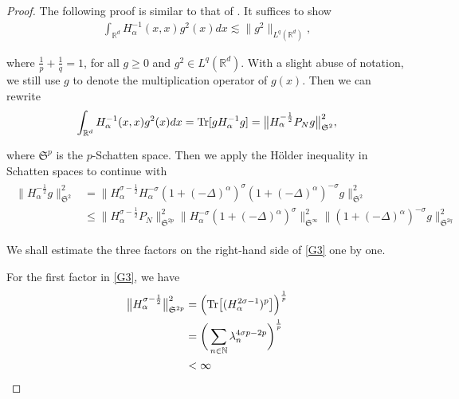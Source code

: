 \documentclass[%
11pt,  reqno]{amsart}
\theoremstyle{remarkstyle}
\newcommand{\1}{\hspace{0.2mm}\text{I}\hspace{0.2mm}}
\newcommand{\noi}{\noindent}
\newcommand{\R}{\mathbb{R}}
\newcommand{\al}{\alpha}
\newcommand{\ld}{\lambda}
\newcommand{\s}{\sigma}
\newcommand{\les}{\lesssim}
\newcommand{\N}{\mathbb{N}}
\numberwithin{equation}{section}
\numberwithin{theorem}{section}
\begin{document}
	
	\begin{proof}
		The following proof is similar to that of \cite{DR23}.  
		It suffices to show
		\begin{align}
			\label{G1}
			\int_{\R^d} H_\al^{-1}  (x,x) g^2(x) dx \les   \|g^2 \|_{L^q (\R^d)},
		\end{align}
		
		\noi 
		where $\frac1p + \frac1q = 1$, for all $g \ge 0$ and $g^{2} \in L^q({\R^d})$.
		With a slight abuse of notation, we still use $g$ to denote the multiplication operator of $g(x)$. 
		Then we can rewrite
		\begin{align}
			\label{G2}
			\int_{\R^d} H_\al^{-1}  (x,x) g^2(x) dx  = \textup{Tr} [g H_\al^{-1}  g]  = \big\|  H_\al^{-\frac12} P_N g\big\|_{\mathfrak S^2}^2,
		\end{align}
		
		\noi
		where $\mathfrak S^p$ is the $p$-Schatten space. 
		Then we apply the H\"older inequality in Schatten spaces to continue with
		\begin{align}
			\begin{split}
				\big\|  H_\al^{-\frac12}  g\big\|_{\mathfrak S^2}^2 & =  \big\|  H_\al^{\s-\frac12}  H_\al^{-\s} (1+ (-\Delta)^\al)^{ \s} (1+ (-\Delta)^\al)^{- \s}  g\big\|_{\mathfrak S^2}^2 \\
				& \le \big\|   H_\al^{\s-\frac12}P_N  \big\|_{\mathfrak S^{2p}}^2 \big\|  H_\al^{-\s} (1+ (-\Delta)^\al)^{ \s}\big\|_{\mathfrak S^\infty}^2 \big\|  (1+ (-\Delta)^\al)^{ -\s}  g\big\|_{\mathfrak S^{2q}}^2
			\end{split}
			\label{G3}
		\end{align}
		
		\noi 
		We shall estimate the three factors on the right-hand side of \eqref{G3} one by one.
		
		For the first factor in \eqref{G3},
		we have
		\begin{align}
			\begin{split}
				\big\|   H_\al^{\s-\frac12}  \big\|_{\mathfrak S^{2p}}^2 
				& = \Big( {\rm{Tr}} \big[ (  H_\al^{2\s-1} )^{p} \big] \Big)^{\frac1{p}}\\
				& = \bigg( \sum_{n\in \N}   \ld_n^{4\s p - 2p} \bigg)^{\frac1p} \\
				& < \infty
			\end{split}
			\label{G4}
		\end{align}
		

\end{proof}
\end{document}
